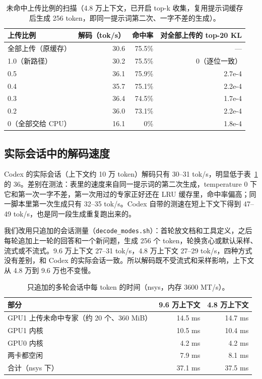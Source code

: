 \documentclass[11pt,a4paper]{article}
\newcommand{\code}[1]{\texttt{#1}}
\newcommand{\tps}{tok/s}
\begin{document}
\begin{table}[h]
  \centering
  \small
  \caption{未命中上传比例的扫描（4.8 万上下文，已开启 top-k 收集，复用提示词缓存后生成 256 token，即同一提示词第二次、一字不差的生成）。}
  \label{tab:admit}
  \begin{tabular}{@{}l r r r@{}}
    \toprule
    上传比例 & 解码（\tps） & 命中率 & 对全部上传的 top-20 KL \\
    \midrule
    全部上传（原缓存） & 30.6 & 75.5\% & — \\
    1.0（新路径） & 30.2 & 75.5\% & 0（逐位一致） \\
    0.5 & 36.1 & 75.9\% & 2.7e-4 \\
    0.4 & 35.7 & 75.1\% & 2.2e-4 \\
    0.3 & 36.4 & 74.5\% & 1.7e-4 \\
    0.2 & 36.0 & 73.1\% & 2.2e-4 \\
    0（全部交给 CPU） & 16.1 & 0\% & 1.8e-4 \\
    \bottomrule
  \end{tabular}
\end{table}

\subsection{实际会话中的解码速度}
\label{sec:realdecode}

Codex 的实际会话（上下文约 10 万 token）解码只有 30--31 \tps{}，明显低于表~\ref{tab:admit} 的 36。差别在测法：表里的速度来自同一提示词的第二次生成，temperature 0 下它和第一次一字不差，第一次用过的专家正好还在 LRU 缓存里，命中率偏高；同一脚本里第一次生成只有 32--35 \tps{}。Codex 自带的测速在短上下文下得到 47--49 \tps{}，也是同一段生成重复跑出来的。

我们改用只追加的会话测量（\code{decode\_modes.sh}）：首轮放文档和工具定义，之后每轮追加上一轮的回答和一个新问题，生成 256 个 token，轮换贪心或默认采样、流式或不流式。9.6 万上下文 27--31 \tps{}，4.8 万上下文 27--29 \tps{}，四种方式没有差别，和 Codex 的实际会话一致。所以解码既不受流式和采样影响，上下文从 4.8 万到 9.6 万也不变慢。

\begin{table}[h]
  \centering
  \small
  \caption{只追加的多轮会话中每 token 的时间（nsys，内存 3600 MT/s）。}
  \label{tab:realdecode}
  \begin{tabular}{@{}l r r@{}}
    \toprule
    部分 & 9.6 万上下文 & 4.8 万上下文 \\
    \midrule
    GPU1 上传未命中专家（约 20 个、360 MiB） & 14.5 ms & 14.7 ms \\
    GPU1 内核 & 10.5 ms & 10.4 ms \\
    GPU0 内核 & 4.2 ms & 4.2 ms \\
    两卡都空闲 & 7.9 ms & 8.1 ms \\
    合计（nsys 下） & 37.1 ms & 37.5 ms \\
    \bottomrule
  \end{tabular}
\end{table}
\end{document}
